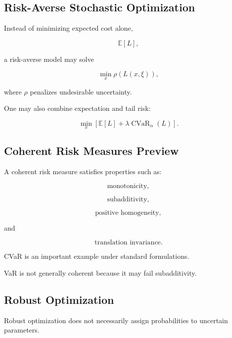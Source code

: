 \subsection{Risk-Averse Stochastic Optimization}
\label{subsec:risk-averse-stochastic-optimization}

Instead of minimizing expected cost alone,

\[
\mathbb{E}[L],
\]

a risk-averse model may solve

\[
\boxed{
\min_x
\rho
(
L(x,\xi)
),
}
\]

where \(\rho\) penalizes undesirable uncertainty.

One may also combine expectation and tail risk:

\[
\boxed{
\min_x
\left[
\mathbb{E}[L]
+
\lambda
\operatorname{CVaR}_{\alpha}(L)
\right].
}
\]

\subsection{Coherent Risk Measures Preview}
\label{subsec:coherent-risk-measures}

A coherent risk measure satisfies properties such as:

\[
\boxed{
\text{monotonicity},
}
\]

\[
\boxed{
\text{subadditivity},
}
\]

\[
\boxed{
\text{positive homogeneity},
}
\]

and

\[
\boxed{
\text{translation invariance}.
}
\]

CVaR is an important example under standard formulations.

VaR is not generally coherent because it may fail subadditivity.

\subsection{Robust Optimization}
\label{subsec:robust-optimization-stochastic}

Robust optimization does not necessarily assign probabilities to
uncertain parameters.

